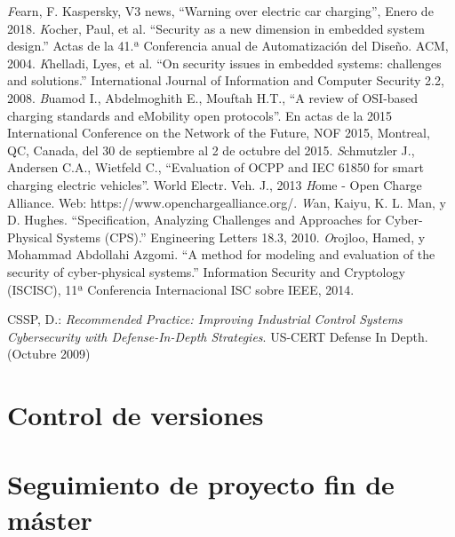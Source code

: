 \documentclass[12pt,a4paper,onecolumn,oneside]{report}
\begin{document}
\begin{thebibliography}{1}
 \textit Fearn, F. Kaspersky, V3 news, ``Warning over electric car charging”, Enero de 2018.
 \textit Kocher, Paul, et al. ``Security as a new dimension in embedded system design.” Actas de la 41.ª Conferencia anual de Automatización del Diseño. ACM, 2004.
 \textit Khelladi, Lyes, et al. ``On security issues in embedded systems: challenges and solutions.” International Journal of Information and Computer Security 2.2, 2008.
 \textit Buamod I., Abdelmoghith E.,  Mouftah H.T., ``A review of OSI-based charging standards and eMobility open protocols”. En actas de la 2015 International Conference on the Network of the Future, NOF 2015, Montreal, QC, Canada, del 30 de septiembre al 2 de octubre del 2015.
 \textit Schmutzler J., Andersen C.A., Wietfeld C., ``Evaluation of OCPP and IEC 61850 for smart charging electric
vehicles”. World Electr. Veh. J., 2013
 \textit Home - Open Charge Alliance. Web: https://www.openchargealliance.org/.
 \textit Wan, Kaiyu, K. L. Man, y D. Hughes. ``Specification, Analyzing Challenges and Approaches for Cyber-Physical Systems (CPS).” Engineering Letters 18.3, 2010.
 \textit Orojloo, Hamed, y Mohammad Abdollahi Azgomi. ``A method for modeling and evaluation of the security of cyber-physical systems.” Information Security and Cryptology (ISCISC), 11ª Conferencia Internacional ISC sobre IEEE, 2014.

{CSSP, D.}:
\newblock \textit{Recommended Practice: Improving Industrial Control Systems
  Cybersecurity with Defense-In-Depth Strategies}.
\newblock US-CERT Defense In Depth. (Octubre 2009)

\end{thebibliography}



\renewcommand{\appendixname}{Anexo}
\appendix

\chapter{Control de versiones}
\label{Control de versiones}




\chapter{Seguimiento de proyecto fin de máster}
\label{Seguimiento de proyecto fin de máster}
\end{document}
